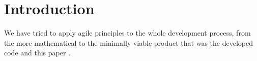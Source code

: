 \section*{Introduction} %



We have tried to apply agile principles to the whole development process, from
the more mathematical to the minimally viable product that was the developed
code and this paper \cite{DBLP:journals/corr/abs-2104-12545}.
